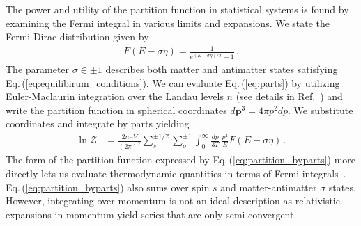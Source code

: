 \documentclass[epjST]{svjour}
\newcommand{\req}[1]{Eq.\,(\ref{#1})}
\begin{document}
The power and utility of the partition function in statistical systems is found by examining the Fermi integral in various limits and expansions. We state the Fermi-Dirac distribution given by
\begin{align}
F\left(E - \sigma\eta\right) = \frac{1}{e^{(E - \sigma\eta)/T} + 1}\,.
\end{align}
The parameter \(\sigma \in {\pm1}\) describes both matter and antimatter states satisfying \req{eq:equilibirum_conditions}. We can evaluate \req{eq:parts} by utilizing Euler-Maclaurin integration over the Landau levels \(n\) (see details in Ref.~\cite{Steinmetz:2023nsc}) and write the partition function in spherical coordinates \(d\mathbf{p}^{3}=4\pi p^{2}dp\). We substitute coordinates and integrate by parts yielding
\begin{align}
\label{eq:partition_byparts}
\ln\mathcal{Z} &= \frac{2 n_\mathrm{C}V}{(2\pi)^{2}} \sum_{s}^{\pm1/2}\sum_{\sigma}^{\pm1}\int_{0}^{\infty} \frac{dp}{3T} \, \frac{p^4}{E}F\left(E - \sigma\eta\right)\,.
\end{align}
The form of the partition function expressed by \req{eq:partition_byparts} more directly lets us evaluate thermodynamic quantities in terms of Fermi integrals~\cite{Elze:1980er,Birrell:2024bdb}. \req{eq:partition_byparts} also sums over spin \(s\) and matter-antimatter \(\sigma\) states. However, integrating over momentum is not an ideal description as relativistic expansions in momentum yield series that are only semi-convergent. 

\end{document}

